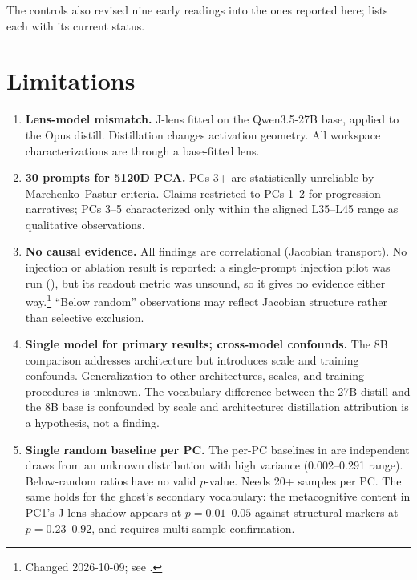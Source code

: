 \documentclass[11pt,a4paper]{article}
\begin{document}
The controls also revised nine early readings into the ones reported here;  lists each with its current status.

\section{Limitations}
\label{sec:limitations}

\begin{enumerate}
  \item\label{lim:lens} \textbf{Lens-model mismatch.} J-lens fitted on the Qwen3.5-27B base, applied to the Opus distill. Distillation changes activation geometry. All workspace characterizations are through a base-fitted lens.

  \item\label{lim:prompts} \textbf{30 prompts for 5120D PCA.} PCs 3+ are statistically unreliable by Marchenko--Pastur criteria. Claims restricted to PCs 1--2 for progression narratives; PCs 3--5 characterized only within the aligned L35--L45 range as qualitative observations.

  \item\label{lim:causal} \textbf{No causal evidence.} All findings are correlational (Jacobian transport). No injection or ablation result is reported: a single-prompt injection pilot was run (), but its readout metric was unsound, so it gives no evidence either way.\footnote{Changed 2026-10-09; see .} ``Below random'' observations may reflect Jacobian structure rather than selective exclusion.

  \item\label{lim:models} \textbf{Single model for primary results; cross-model confounds.} The 8B comparison addresses architecture but introduces scale and training confounds. Generalization to other architectures, scales, and training procedures is unknown. The vocabulary difference between the 27B distill and the 8B base is confounded by scale and architecture: distillation attribution is a hypothesis, not a finding.

  \item\label{lim:baselines} \textbf{Single random baseline per PC.} The per-PC baselines in  are independent draws from an unknown distribution with high variance (0.002--0.291 range). Below-random ratios have no valid $p$-value. Needs 20+ samples per PC. The same holds for the ghost's secondary vocabulary: the metacognitive content in PC1's J-lens shadow appears at $p = 0.01$--$0.05$ against structural markers at $p = 0.23$--$0.92$, and requires multi-sample confirmation.


\end{enumerate}
\end{document}
